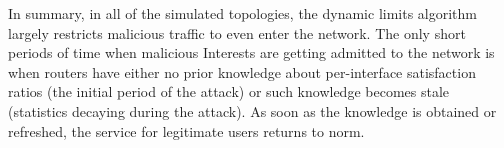In summary, in all of the simulated topologies, the dynamic limits algorithm largely restricts malicious traffic to even enter the network.
The only short periods of time when malicious Interests are getting admitted to the network is when routers have either no prior knowledge about per-interface satisfaction ratios (the initial period of the attack) or such knowledge becomes stale (statistics decaying during the attack).
As soon as the knowledge is obtained or refreshed, the service for legitimate users returns to norm.





